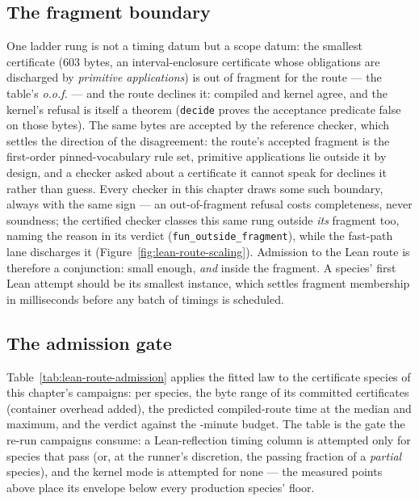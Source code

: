 \subsection{The fragment boundary}

One ladder rung is not a timing datum but a scope datum: the smallest
certificate ($603$ bytes, an interval-enclosure certificate whose
obligations are discharged by \emph{primitive applications}) is out of
fragment for the route --- the table's \emph{o.o.f.} --- and the route
declines it: compiled and kernel agree, and the kernel's refusal is
itself a theorem (\texttt{decide} proves the acceptance predicate
false on those bytes). The same bytes are accepted by the reference
checker, which settles the direction of the disagreement: the route's
accepted fragment is the first-order pinned-vocabulary rule set,
primitive applications lie outside it by design, and a checker asked
about a certificate it cannot speak for declines it rather than
guess. Every checker in this chapter draws some such boundary, always
with the same sign --- an out-of-fragment refusal costs completeness,
never soundness; the certified checker classes this same rung outside
\emph{its} fragment too, naming the reason in its verdict
(\texttt{fun\_outside\_fragment}), while the fast-path lane discharges
it (Figure~\ref{fig:lean-route-scaling}). Admission to the Lean route
is therefore a conjunction: small enough, \emph{and} inside the
fragment. A species' first Lean attempt should be its smallest
instance, which settles fragment membership in milliseconds before
any batch of timings is scheduled.

\subsection{The admission gate}

Table~\ref{tab:lean-route-admission} applies the fitted law to the
certificate species of this chapter's campaigns: per species, the
byte range of its committed certificates (container overhead added),
the predicted compiled-route time at the median and maximum, and the
verdict against the \LeanRouteBudgetMin-minute budget. The table is the
gate the re-run campaigns consume: a Lean-reflection timing column is
attempted only for species that pass (or, at the runner's discretion,
the passing fraction of a \emph{partial} species), and the kernel mode
is attempted for none --- the measured points above place its envelope
below every production species' floor.

